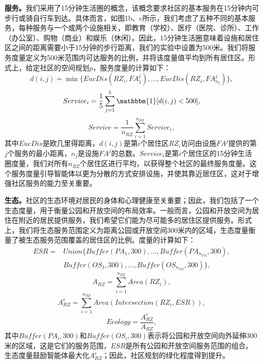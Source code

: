 \textbf{服务。}我们采用了15分钟生活圈的概念，该概念要求社区的基本服务在15分钟内可步行或骑自行车到达。具体而言，如图1b、c所示，我们考虑了五种不同的基本服务，每种服务与一个或两个设施相关，即教育（学校）、医疗（医院、诊所）、工作（办公室）、购物（商业）和娱乐（休闲）。因此，15分钟生活圈意味着设施和居住区之间的距离需要小于15分钟的步行距离，我们的实验中设置为500米。我们将服务度量定义为500米范围内可达服务的比例，并将该度量值平均到所有居住区。形式上，给定社区的空间规划$p$，服务度量的计算如下：
\begin{equation}
    d(i,j) = \min\{EucDis(RZ_i,FA_1^j),\dots,EucDis(RZ_i,FA_{n_j}^j)\},
\end{equation}
\begin{equation}
    Service_i = \frac{1}{5}\sum_{j=1}^{5}\mathbbm{1}[d(i,j)<500],
\end{equation}
\begin{equation}
    Service = \frac{1}{n_{RZ}}\sum_{i=1}^{n_{RZ}}Service_i,
\end{equation}
其中$EucDis$是欧几里得距离，$d(i,j)$是第$i$个居住区$RZ_i$访问由设施$FA^j$提供的第$j$个服务的最小距离，$n_j$是设施$FA^j$的总数。$Service_i$是第$i$个居住区的15分钟生活圈度量，我们对所有$n_{RZ}$个居住区进行平均，以获得整个社区的最终服务度量。这个服务度量引导智能体以更为分散的方式安排设施，并使其靠近居住区，这对于增强社区服务的能力至关重要。

\textbf{生态。}社区的生态环境对居民的身体和心理健康至关重要；因此，我们包括了一个生态度量，用于衡量公园和开放空间的布局效率。一般而言，公园和开放空间为居住在附近的居民提供服务，我们希望它们能为尽可能多的居住区提供服务。形式上，我们将生态服务范围定义为距离公园或开放空间300米内的区域，生态度量衡量了被生态服务范围覆盖的居住区的比例。度量的计算如下：
\begin{equation}
    \begin{aligned}
        ESR = & Union\{Buffer(PA_1,300),\dots,Buffer(PA_{n_{PA}},300),\\
        & Buffer(OS_1,300),\dots,Buffer(OS_{n_{OS}},300)\},
    \end{aligned}
\end{equation}
\begin{equation}
    A_{RZ} = \sum_{i=1}^{n_{RZ}}Area(RZ_i),
\end{equation}
\begin{equation}
    A_{RZ}^e = \sum_{i=1}^{n_{RZ}}Area(Intersection(RZ_i,ESR)),
\end{equation}
\begin{equation}
    Ecology = \frac{A_{RZ}^e}{A_{RZ}},
\end{equation}
其中$Buffer(PA_i,300)$和$Buffer(OS_i,300)$表示将公园和开放空间向外延伸300米的区域，这是它们的服务范围，$ESR$是所有公园和开放空间服务范围的组合。生态度量鼓励智能体最大化$A^e_{RZ}$；因此，社区规划的绿化程度得到提升。

